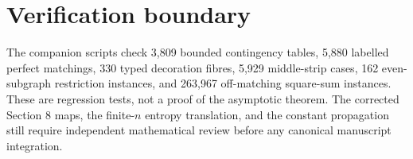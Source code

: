 \documentclass[11pt]{article}
\begin{document}
\section{Verification boundary}

The companion scripts check 3,809 bounded contingency tables, 5,880 labelled
perfect matchings, 330 typed decoration fibres, 5,929 middle-strip cases, 162
even-subgraph restriction instances, and 263,967 off-matching square-sum
instances.  These are regression tests, not a proof of the asymptotic theorem.
The corrected Section 8 maps, the finite-\(n\) entropy translation, and the
constant propagation still require independent mathematical review before any
canonical manuscript integration.
\end{document}
